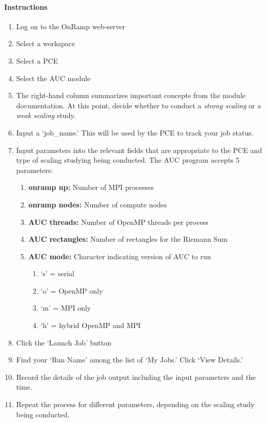 \paragraph{Instructions}
\begin{enumerate}
\item Log on to the OnRamp web-server
\item Select a workspace
\item Select a PCE
\item Select the AUC module
\item The right-hand column summarizes important concepts from the module documentation. At this point, decide whether to conduct a \emph{strong scaling} or a \emph{weak scaling} study.
\item Input a `job\_name.' This will be used by the PCE to track your job status.
\item Input parameters into the relevant fields that are appropriate to the PCE and type of scaling studying being conducted. The AUC program accepts 5 parameters:
\begin{enumerate}
\item \textbf{onramp np:} Number of MPI processes
\item \textbf{onramp nodes:} Number of compute nodes
\item \textbf{AUC threads:} Number of OpenMP threads per process
\item \textbf{AUC rectangles:} Number of rectangles for the Riemann Sum
\item \textbf{AUC mode:} Character indicating version of AUC to run
\begin{enumerate}
\item `s' = serial
\item `o' = OpenMP only
\item `m' = MPI only
\item `h' = hybrid OpenMP and MPI
\end{enumerate}
\end{enumerate}
\item Click the `Launch Job' button
\item Find your `Run Name' among the list of `My Jobs.' Click `View Details.'
\item Record the details of the job output including the input parameters and the time.
\item Repeat the process for different parameters, depending on the scaling study being conducted.
\end{enumerate}

